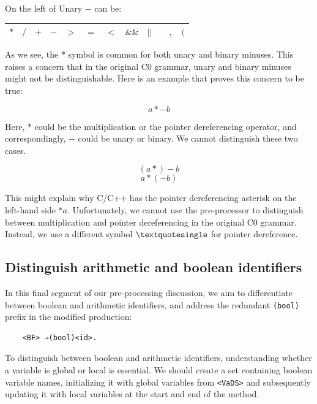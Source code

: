 On the left of Unary \(-\) can be:
\begin{center}
    \begin{tabular}{|c|c|c|c|c|c|c|c|c|c|c|c|}
        \hline
        \( \ast \) & \( / \) & \( + \) & \( - \) & \( > \) & \( = \) & \( < \) & \( \&\& \) & \( || \) & \( \) & \( , \) & \( ( \)\\
        \hline
    \end{tabular}
\end{center}

As we see, the \( * \) symbol is common for both unary and binary minuses. This raises a concern that in the original C0 grammar, unary and binary minuses might not be distinguishable. Here is an example that proves this concern to be true:

\[a*-b\]

Here, \( * \) could be the multiplication or the pointer dereferencing operator, and correspondingly, \( - \) could be unary or binary. We cannot distinguish these two cases.

\[(a*)-b\]
\[a*(-b)\]

This might explain why C/C++ has the pointer dereferencing asterisk on the left-hand side \(*a\). Unfortunately, we cannot use the pre-processor to distinguish between multiplication and pointer dereferencing in the original C0 grammar. Instead, we use a different symbol \(\textquotesingle\) for pointer dereference.

\vspace{30pt}

\subsection{Distinguish arithmetic and boolean identifiers}

In this final segment of our pre-processing discussion, we aim to differentiate between boolean and arithmetic identifiers, and address the redundant \texttt{(bool)} prefix in the modified production:

\begin{verbatim}
    <BF> →(bool)<id>.
\end{verbatim}

To distinguish between boolean and arithmetic identifiers, understanding whether a variable is global or local is essential. We should create a set containing boolean variable names, initializing it with global variables from \texttt{<VaDS>} and subsequently updating it with local variables at the start and end of the method.

